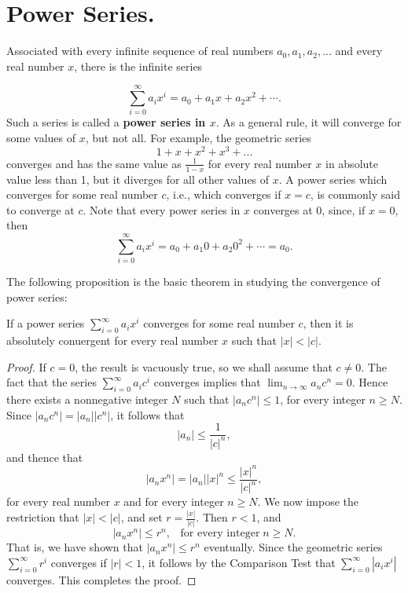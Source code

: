 \section{Power Series.}
 Associated with every infinite sequence of real numbers $a_0, a_1, a_2, . . .$ and every real number $x$, there is the infinite series

$$
\sum_{i=0}^\infty a_{i} x^i = a_0 + a_{1} x + a_{2} x^2 + \cdots . 
$$
\noindent Such a series is called a \textbf{power series in $x$}. As a general rule, it will converge for some values of $x$, but not all. For example, the geometric series
$$
1 + x + x^2 + x^3 + . . .
$$
\noindent converges and has the same value as $\frac{1}{1-x}$ for every real number $x$ in absolute value less than 1, but it diverges for all other values of $x$. A power series which converges for some real number $c$, i.e., which converges if $x = c$, is commonly said to converge at $c$. Note that every power series in $x$ converges at 0, since, if $x = 0$, then
$$
\sum_{i=0}^\infty a_{i}x^i = a_0 + a_{1}0 + a_{2}0^2 + \cdots = a_0. 
$$

The following proposition is the basic theorem in studying the convergence of power series:

\begin{theorem}  
If a power series $\sum_{i=0}^\infty a_{i}x^i$ converges for some real number $c$, then it is absolutely conuergent for every real number $x$ such that $|x| < |c|$.
\end{theorem}


\begin{proof}
If $c = 0$, the result is vacuously true, so we shall assume that $c \neq 0$. The fact that the series $\sum_{i=0}^\infty a_{i}c^i$ converges implies that $\lim_{n \rightarrow \infty} a_{n}c^n= 0$. Hence there exists a nonnegative integer $N$ such that $|a_{n}c^n| \leq 1$, for every integer $n \geq N$. Since $|a_{n}c^n| = |a_n| |c^n|$, it follows that
$$
|a_n| \leq \frac{1}{|c|^n}, 
$$
and thence that
$$
|a_{n}x^n| = |a_n| |x|^n \leq \frac{|x|^n}{|c|^n}  ,
$$
for every real number $x$ and for every integer $n \geq N$. We now impose the restriction that $|x| < |c|$, and set $r = \frac{|x|}{|c|}$. Then $r < 1$, and  
$$
|a_{n}x^n| \leq r^n, \;\;\;\mbox{for every integer}\; n \geq N.
$$
That is, we have shown that $|a_{n}x^n| \leq r^n$ eventually. Since the geometric series $\sum_{i=0}^\infty r^i$ converges if $|r| < 1$, it follows by the Comparison Test that $\sum_{i=0}^\infty |a_{i} x^i|$ converges. This completes the proof.
\end{proof}


